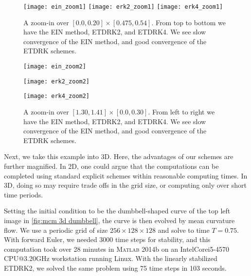 \begin{figure}[htb!]
        \centering
\texttt{[image: ein\_zoom1]}
\texttt{[image: erk2\_zoom1]}
\texttt{[image: erk4\_zoom1]}
\caption[{A zoom-in over $ [0.0,0.20]\times [0.475,0.54]$ to inspect convergence.}]{A zoom-in over $[0.0, 0.20]\times [0.475, 0.54]$. From top to bottom we have the EIN method, ETDRK2, and ETDRK4. We see slow convergence of the EIN method, and good convergence of the ETDRK schemes.}
\label{fig:mcm zoom in 1}
\end{figure}

\begin{figure}[htb!]
        \centering
\begin{minipage}{0.30\textwidth}
        \texttt{[image: ein\_zoom2]}
\end{minipage}
\begin{minipage}{0.30\textwidth}
        \texttt{[image: erk2\_zoom2]}
\end{minipage}
\begin{minipage}{0.30\textwidth}
        \texttt{[image: erk4\_zoom2]}
\end{minipage}
\caption[{A zoom-in over $[1.30,1.41]\times [0.0, 0.30]$ to inspect convergence.}]{A zoom-in over $[1.30,1.41]\times [0.0, 0.30]$. From left to right we have the EIN method, ETDRK2, and ETDRK4. We see slow convergence of the EIN method, and good convergence of the ETDRK schemes.}
\label{fig:mcm zoom in 2}
\end{figure}

Next, we take this example into 3D. Here, the advantages of our schemes are further magnified. In 2D, one could argue that the computations can be completed using standard explicit schemes within reasonable computing times. In 3D, doing so may require trade offs in the grid size, or computing only over short time periods. 

Setting the initial condition to be the dumbbell-shaped curve of the top left image in \cref{fig:mcm 3d dumbbell}, the curve is then evolved by mean curvature flow. We use a periodic grid of size $256\times 128\times 128$ and solve to time $T=0.75$. With forward Euler, we needed $3000$ time steps for stability, and this computation took over 28 minutes in \textsc{Matlab} 2014b on an Intel\textsuperscript{\textregistered}Core\textsuperscript{\texttrademark}i5-4570 CPU@3.20GHz workstation running Linux. With the linearly stabilized ETDRK2, we solved the same problem using 75 time steps in 103 seconds.

